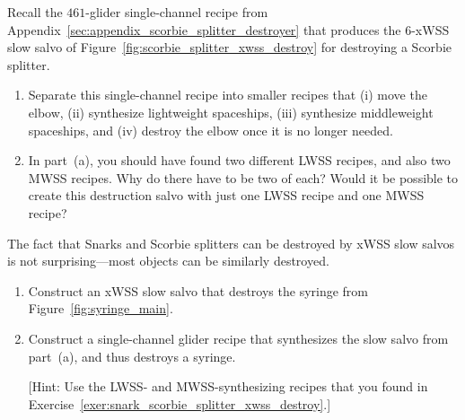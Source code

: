 \begin{multicols}{2}
	
	\mfilbreak
	
	
	\begin{problem}\label{exer:snark_scorbie_splitter_xwss_destroy} 
		Recall the $461$-glider single-channel recipe from Appendix~\ref{sec:appendix_scorbie_splitter_destroyer} that produces the $6$-xWSS slow salvo of Figure~\ref{fig:scorbie_splitter_xwss_destroy} for destroying a Scorbie splitter.
		
		\begin{enumerate}[label=\bf\color{ocre}(\alph*)]
			\item Separate this single-channel recipe into smaller recipes that (i) move the elbow, (ii) synthesize lightweight spaceships, (iii) synthesize middleweight spaceships, and (iv) destroy the elbow once it is no longer needed.
			
			\item In part~(a), you should have found two different LWSS recipes, and also two MWSS recipes. Why do there have to be two of each? Would it be possible to create this destruction salvo with just one LWSS recipe and one MWSS recipe?
		\end{enumerate}
	\end{problem}
	
	
	\mfilbreak
	
	
	\begin{problem}\label{exer:syringe_xwss_destroy} 
		The fact that Snarks and Scorbie splitters can be destroyed by xWSS slow salvos is not surprising---most objects can be similarly destroyed.
		
		\begin{enumerate}[label=\bf\color{ocre}(\alph*)]
			\item Construct an xWSS slow salvo that destroys the syringe from Figure~\ref{fig:syringe_main}.
			
			\item Construct a single-channel glider recipe that synthesizes the slow salvo from part~(a), and thus destroys a syringe.
			
			[Hint: Use the LWSS- and MWSS-synthesizing recipes that you found in Exercise~\ref{exer:snark_scorbie_splitter_xwss_destroy}.]
		\end{enumerate}
	\end{problem}
	
	
	\mfilbreak
	

\end{multicols}
